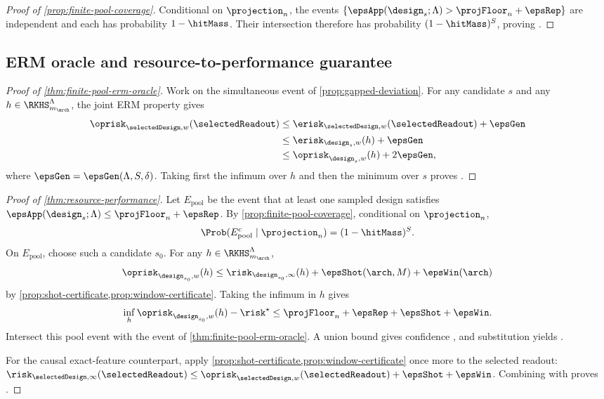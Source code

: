 \begin{proof}[Proof of \cref{prop:finite-pool-coverage}]
Conditional on $\projection_n$, the events
$\{\epsApp(\design_s;\Lambda)>\projFloor_n+\epsRep\}$ are independent and each
has probability $1-\hitMass$.  Their intersection therefore has
probability $(1-\hitMass)^S$, proving
.
\end{proof}

\subsection{ERM oracle and resource-to-performance guarantee}

\begin{proof}[Proof of \cref{thm:finite-pool-erm-oracle}]
Work on the simultaneous event of \cref{prop:gapped-deviation}.  For any
candidate $s$ and any $h\in\RKHS_{m_{\arch}}^\Lambda$, the joint ERM property
 gives
\begin{align*}
    \oprisk_{\selectedDesign,w}(\selectedReadout)
    &\leq\erisk_{\selectedDesign,w}(\selectedReadout)+\epsGen\\
    &\leq\erisk_{\design_s,w}(h)+\epsGen\\
    &\leq\oprisk_{\design_s,w}(h)+2\epsGen,
\end{align*}
where $\epsGen=\epsGen(\Lambda,S,\delta)$.  Taking first the infimum over $h$
and then the minimum over $s$ proves .
\end{proof}

\begin{proof}[Proof of \cref{thm:resource-performance}]
Let $E_{\mathrm{pool}}$ be the event that at least one sampled design
satisfies
$\epsApp(\design_s;\Lambda)\leq\projFloor_n+\epsRep$.  By
\cref{prop:finite-pool-coverage}, conditional on $\projection_n$,
\[
    \Prob(E_{\mathrm{pool}}^c\mid\projection_n)
    =(1-\hitMass)^S.
\]
On $E_{\mathrm{pool}}$, choose such a candidate $s_0$.  For any
$h\in\RKHS_{m_{\arch}}^\Lambda$,
\[
    \oprisk_{\design_{s_0},w}(h)
    \leq\risk_{\design_{s_0},\infty}(h)
       +\epsShot(\arch,M)+\epsWin(\arch)
\]
by \cref{prop:shot-certificate,prop:window-certificate}.  Taking the infimum in
$h$ gives
\[
    \inf_h\oprisk_{\design_{s_0},w}(h)-\risk^\star
    \leq\projFloor_n+\epsRep+\epsShot+\epsWin.
\]
Intersect this pool event with the event of
\cref{thm:finite-pool-erm-oracle}.  A union bound gives confidence
, and substitution yields
.

For the causal exact-feature counterpart, apply
\cref{prop:shot-certificate,prop:window-certificate} once more to the selected
readout:
$\risk_{\selectedDesign,\infty}(\selectedReadout)
\leq\oprisk_{\selectedDesign,w}(\selectedReadout)+\epsShot+\epsWin$.
Combining with  proves
.
\end{proof}

